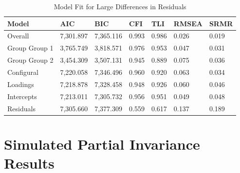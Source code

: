 \documentclass[
  man,floatsintext]{apa7}
\begin{document}
\begin{table}[tbp]

\begin{center}
\begin{threeparttable}

\caption{\label{tab:tab10}Model Fit for Large Differences in Residuals}

\begin{tabular}{lllllll}
\toprule
Model & AIC & BIC & CFI & TLI & RMSEA & SRMR\\
\midrule
Overall & 7,301.897 & 7,365.116 & 0.993 & 0.986 & 0.026 & 0.019\\
Group Group 1 & 3,765.749 & 3,818.571 & 0.976 & 0.953 & 0.047 & 0.031\\
Group Group 2 & 3,454.309 & 3,507.131 & 0.945 & 0.889 & 0.075 & 0.036\\
Configural & 7,220.058 & 7,346.496 & 0.960 & 0.920 & 0.063 & 0.034\\
Loadings & 7,218.878 & 7,328.458 & 0.948 & 0.926 & 0.060 & 0.046\\
Intercepts & 7,213.011 & 7,305.732 & 0.956 & 0.951 & 0.049 & 0.048\\
Residuals & 7,305.660 & 7,377.309 & 0.559 & 0.617 & 0.137 & 0.189\\
\bottomrule
\end{tabular}

\end{threeparttable}
\end{center}

\end{table}

\section{Simulated Partial Invariance Results}\label{simulated-partial-invariance-results}
\end{document}
